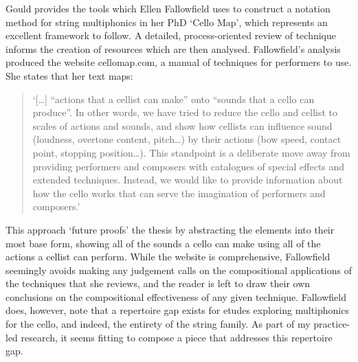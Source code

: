 Gould provides the tools which Ellen Fallowfield uses to construct a notation method for string multiphonics in her PhD ‘Cello Map’, which represents an excellent framework to follow. A detailed, process-oriented review of technique informs the creation of resources which are then analysed.\autocite{fallowfieldCelloMapHandbook2009}  Fallowfield’s analysis produced the website cellomap.com, a manual of techniques for performers to use. She states that her text maps:
\begin{quotation}
    ‘[\ldots] “actions that a cellist can make” onto “sounds that a cello can produce”. In other words, we have tried to reduce the cello and cellist to scales of actions and sounds, and show how cellists can influence sound (loudness, overtone content, pitch…) by their actions (bow speed, contact point, stopping position…). This standpoint is a deliberate move away from providing performers and composers with catalogues of special effects and extended techniques. Instead, we would like to provide information about how the cello works that can serve the imagination of performers and composers.’\autocite{fallowfieldCelloMap}
\end{quotation}
This approach ‘future proofs’ the thesis by abstracting the elements into their most base form, showing all of the sounds a cello can make using all of the actions a cellist can perform. While the website is comprehensive, Fallowfield seemingly avoids making any judgement calls on the compositional applications of the techniques that she reviews, and the reader is left to draw their own conclusions on the compositional effectiveness of any given technique. Fallowfield does, however, note that a repertoire gap exists for etudes exploring multiphonics for the cello, and indeed, the entirety of the string family. As part of my practice-led research, it seems fitting to compose a piece that addresses this repertoire gap.

